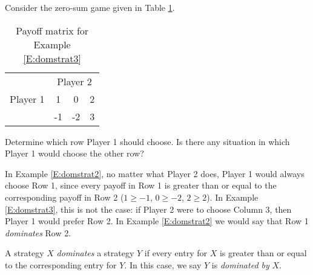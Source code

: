 \begin{example}\label{E:domstrat3} Consider the zero-sum game given in Table \ref{T:biggerexample2}.



\begin{table}[h]
\centering

\begin{tabular}{cccc}
                      & \multicolumn{3}{c}{Player 2}                                                  \\ \cline{2-4} 
\multicolumn{1}{l|}{Player 1} & \multicolumn{1}{c|}{1} & \multicolumn{1}{c|}{0} & \multicolumn{1}{c|}{2} \\ \cline{2-4} 
\multicolumn{1}{l|}{} & \multicolumn{1}{c|}{-1} & \multicolumn{1}{c|}{-2} & \multicolumn{1}{c|}{3} \\ \cline{2-4} 
\end{tabular}
\caption{Payoff matrix for Example \ref{E:domstrat3}}
\label{T:biggerexample2}
\end{table}



Determine which row Player 1 should choose. Is there any situation in which Player 1 would choose the other row? 
\end{example}


In Example \ref{E:domstrat2}, no matter what Player 2 does, Player 1 would always choose Row 1, since every payoff in Row 1 is greater than or equal to the corresponding payoff in Row 2 ($1\ge -1$, $0\ge -2$, $2\ge 2$). In Example \ref{E:domstrat3}, this is not the case: if Player 2 were to choose Column 3, then Player 1 would prefer Row 2. In Example \ref{E:domstrat2} we would say that Row 1 {\it dominates} Row 2.


\begin{definition} A strategy $X$ \emph{dominates} a strategy $Y$ if every entry for $X$ is greater than or equal to the corresponding entry for $Y$. In this case, we say $Y$ is \emph{dominated by} $X$.
\end{definition}


